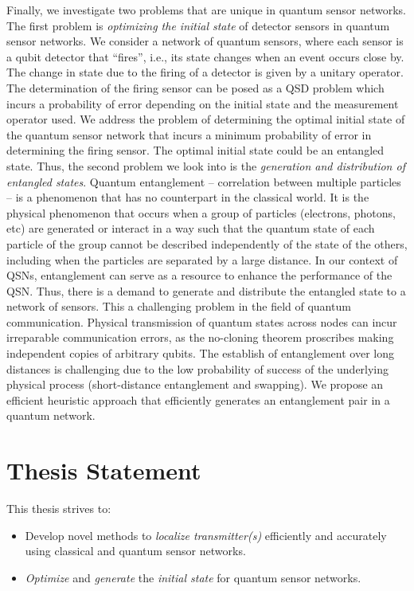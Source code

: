 Finally, we investigate two problems that are unique in quantum sensor networks. 
The first problem is \emph{optimizing the initial state} of detector sensors 
in quantum sensor networks. We consider a network of quantum sensors, where each sensor is a qubit detector that “fires”, 
i.e., its state changes when an event occurs close by. The change in state due to the firing of a detector is given 
by a unitary operator. The determination of the firing sensor can be posed as a QSD problem which incurs a probability 
of error depending on the initial state and the measurement operator used. We address the problem of determining 
the optimal initial state of the quantum sensor network that incurs a minimum probability of error in determining the firing sensor.
The optimal initial state could be an entangled state.
Thus, the second problem we look into is the \emph{generation and distribution of entangled states}.
Quantum entanglement -- correlation between multiple particles -- is a phenomenon that has no counterpart in the classical world.
It is the physical phenomenon that occurs when a group of particles (electrons, photons, etc) are generated or 
interact in a way such that the quantum state of each particle of the group cannot be described independently 
of the state of the others, including when the particles are separated by a large distance.
In our context of QSNs, entanglement can serve as a resource to enhance the performance of the QSN.
Thus, there is a demand to generate and distribute the entangled state to a network of sensors. 
This a challenging problem in the field of quantum communication.
Physical transmission of quantum states across nodes can incur irreparable communication errors, as the no-cloning theorem proscribes
making independent copies of arbitrary qubits.
The establish of entanglement over long distances is challenging due to the low probability of success of the underlying physical process
(short-distance entanglement and swapping). 
We propose an efficient heuristic approach that efficiently generates an entanglement pair in a quantum network.


\section{Thesis Statement}

This thesis strives to:
\begin{itemize}
      \item Develop novel methods to \emph{localize transmitter(s)} efficiently and accurately using classical and quantum sensor networks.
      \item \emph{Optimize} and \emph{generate} the \emph{initial state} for quantum sensor networks.
\end{itemize}

